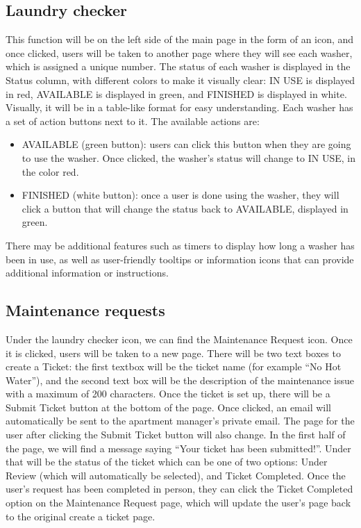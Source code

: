 \documentclass[conference]{IEEEtran}
\begin{document}
\subsection{Laundry checker}
This function will be on the left side of the main page in the form of an icon, and once clicked, users will be taken to another page where they will see each washer, which is assigned a unique number. The status of each washer is displayed in the Status column, with different colors to make it visually clear: IN USE is displayed in red, AVAILABLE is displayed in green, and FINISHED is displayed in white. Visually, it will be in a table-like format for easy understanding. Each washer has a set of action buttons next to it. The available actions are:
\begin{itemize}
    \item AVAILABLE (green button): users can click this button when they are going to use the washer. Once clicked, the washer’s status will change to IN USE, in the color red.
    \item FINISHED (white button): once a user is done using the washer, they will click a button that will change the status back to AVAILABLE, displayed in green.
\end{itemize}

There may be additional features such as timers to display how long a washer has been in use, as well as user-friendly tooltips or information icons that can provide additional information or instructions.
\subsection{Maintenance requests}
Under the laundry checker icon, we can find the Maintenance Request icon. Once it is clicked, users will be taken to a new page. There will be two text boxes to create a Ticket: the first textbox will be the ticket name (for example “No Hot Water”), and the second text box will be the description of the maintenance issue with a maximum of 200 characters. Once the ticket is set up, there will be a Submit Ticket button at the bottom of the page. Once clicked, an email will automatically be sent to the apartment manager's private email. The page for the user after clicking the Submit Ticket button will also change. In the first half of the page, we will find a message saying “Your ticket has been submitted!”. Under that will be the status of the ticket which can be one of two options: Under Review (which will automatically be selected), and Ticket Completed. Once the user’s request has been completed in person, they can click the Ticket Completed option on the Maintenance Request page, which will update the user’s page back to the original create a ticket page.
\end{document}
